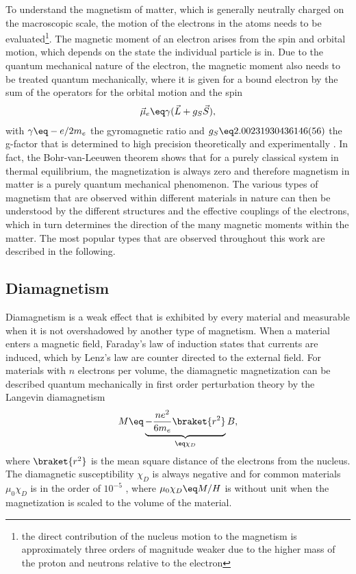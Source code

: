 \documentclass[\main/dresen_thesis.tex]{subfiles}
\begin{document}
    To understand the magnetism of matter, which is generally neutrally charged on the macroscopic scale, the motion of the electrons in the atoms needs to be evaluated\footnote{the direct contribution of the nucleus motion to the magnetism is approximately three orders of magnitude weaker due to the higher mass of the proton and neutrons relative to the electron}.
    The magnetic moment of an electron arises from the spin and orbital motion, which depends on the state the individual particle is in.
    Due to the quantum mechanical nature of the electron, the magnetic moment also needs to be treated quantum mechanically, where it is given for a bound electron by the sum of the operators for the orbital motion and the spin \cite{Coey_2010_Magne}
    \begin{align}
      \vec{\mu}_e \eq \gamma (\vec{L} + g_S \vec{S}),
    \end{align}
    with $\gamma \eq -e/2m_e$ the gyromagnetic ratio and $g_S \eq 2.00231930436146(56)$ the g-factor that is determined to high precision theoretically and experimentally \cite{Aoyama_2012_Tenth, Hanneke_2011_Cavit}.
    In fact, the Bohr-van-Leeuwen theorem shows that for a purely classical system in thermal equilibrium, the magnetization is always zero and therefore magnetism in matter is a purely quantum mechanical phenomenon.
    The various types of magnetism that are observed within different materials in nature can then be understood by the different structures and the effective couplings of the electrons, which in turn determines the direction of the many magnetic moments within the matter.
    The most popular types that are observed throughout this work are described in the following.

    \subsection{Diamagnetism}
      Diamagnetism is a weak effect that is exhibited by every material and measurable when it is not overshadowed by another type of magnetism.
      When a material enters a magnetic field, Faraday's law of induction states that currents are induced, which by Lenz's law are counter directed to the external field.
      For materials with $n$ electrons per volume, the diamagnetic magnetization can be described quantum mechanically in first order perturbation theory by the Langevin diamagnetism \cite{Blundell_2001_Magne}
      \begin{align}
        M \eq \underbrace{- \frac{n e^2}{6 m_e} \braket{r^2}}_{\eq \chi_D} B,
      \end{align}
      where $\braket{r^2}$ is the mean square distance of the electrons from the nucleus.
      The diamagnetic susceptibility $\chi_D$ is always negative and for common materials $\mu_0 \chi_D$ is in the order of $10^{-5}$ \cite{Lide_2004_Handb}, where $\mu_0 \chi_D \eq M/H$ is without unit when the magnetization is scaled to the volume of the material.
\end{document}
